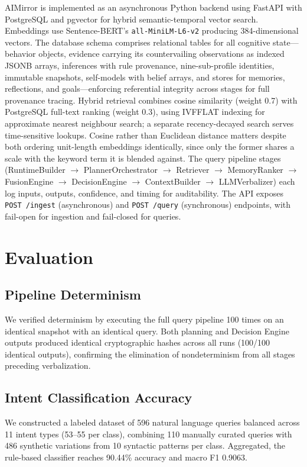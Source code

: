 \documentclass[conference]{IEEEtran}
\begin{document}
AIMirror is implemented as an asynchronous Python backend using FastAPI with PostgreSQL and pgvector for hybrid semantic-temporal vector search. Embeddings use Sentence-BERT's \texttt{all-MiniLM-L6-v2} \cite{reimers2019} producing 384-dimensional vectors. The database schema comprises relational tables for all cognitive state---behavior objects, evidence carrying its countervailing observations as indexed JSONB arrays, inferences with rule provenance, nine-sub-profile identities, immutable snapshots, self-models with belief arrays, and stores for memories, reflections, and goals---enforcing referential integrity across stages for full provenance tracing. Hybrid retrieval combines cosine similarity (weight 0.7) with PostgreSQL full-text ranking (weight 0.3), using IVFFLAT indexing for approximate nearest neighbour search; a separate recency-decayed search serves time-sensitive lookups. Cosine rather than Euclidean distance matters despite both ordering unit-length embeddings identically, since only the former shares a scale with the keyword term it is blended against. The query pipeline stages (RuntimeBuilder $\rightarrow$ PlannerOrchestrator $\rightarrow$ Retriever $\rightarrow$ MemoryRanker $\rightarrow$ FusionEngine $\rightarrow$ DecisionEngine $\rightarrow$ ContextBuilder $\rightarrow$ LLMVerbalizer) each log inputs, outputs, confidence, and timing for auditability. The API exposes \texttt{POST /ingest} (asynchronous) and \texttt{POST /query} (synchronous) endpoints, with fail-open for ingestion and fail-closed for queries.

\section{Evaluation}
\label{sec:evaluation}

\subsection{Pipeline Determinism}
We verified determinism by executing the full query pipeline 100 times on an identical snapshot with an identical query. Both planning and Decision Engine outputs produced identical cryptographic hashes across all runs (100/100 identical outputs), confirming the elimination of nondeterminism from all stages preceding verbalization.

\subsection{Intent Classification Accuracy}
We constructed a labeled dataset of 596 natural language queries balanced across 11 intent types (53--55 per class), combining 110 manually curated queries with 486 synthetic variations from 10 syntactic patterns per class. Aggregated, the rule-based classifier reaches 90.44\% accuracy and macro F1 0.9063.
\end{document}
